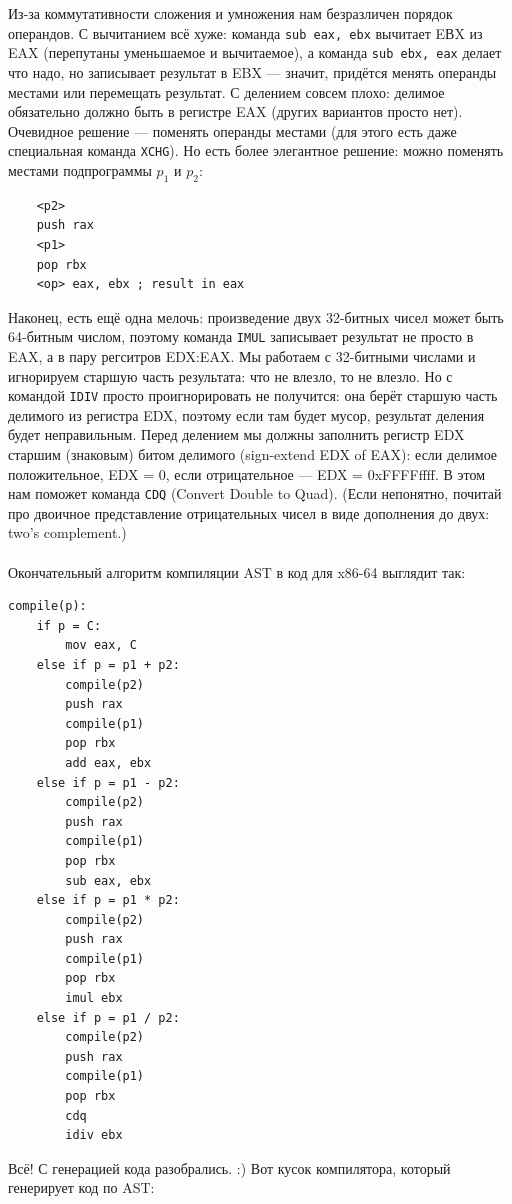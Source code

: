 \documentclass[11pt]{book}
\begin{document}
Из-за коммутативности сложения и умножения нам безразличен порядок операндов.
С вычитанием всё хуже: команда \texttt{sub eax, ebx} вычитает EВX из EAX (перепутаны уменьшаемое и вычитаемое),
а команда \texttt{sub ebx, eax} делает что надо, но записывает результат в EBX ---
значит, придётся менять операнды местами или перемещать результат.
С делением совсем плохо: делимое обязательно должно быть в регистре EAX (других вариантов просто нет).
Очевидное решение --- поменять операнды местами (для этого есть даже специальная команда \texttt{XCHG}).
Но есть более элегантное решение: можно поменять местами подпрограммы $p_1$ и $p_2$:
\begin{verbatim}
    <p2>
    push rax
    <p1>
    pop rbx
    <op> eax, ebx ; result in eax
\end{verbatim}
Наконец, есть ещё одна мелочь:
произведение двух 32-битных чисел может быть 64-битным числом, поэтому команда \texttt{IMUL}
записывает результат не просто в EAX, а в пару регситров EDX:EAX.
Мы работаем с 32-битными числами и игнорируем старшую часть результата: что не влезло, то не влезло.
Но с командой \texttt{IDIV} просто проигнорировать не получится: она берёт старшую часть делимого из регистра EDX,
поэтому если там будет мусор, результат деления будет неправильным.
Перед делением мы должны заполнить регистр EDX старшим (знаковым) битом делимого (sign-extend EDX of EAX): если делимое положительное, EDX = 0,
если отрицательное --- EDX = 0xFFFFffff.
В этом нам поможет команда \texttt{CDQ} (Convert Double to Quad).
(Если непонятно, почитай про двоичное представление отрицательных чисел в виде дополнения до двух: two's complement.)
\\ \\
Окончательный алгоритм компиляции AST в код для x86-64 выглядит так:
\begin{verbatim}
compile(p):
    if p = C:
        mov eax, C
    else if p = p1 + p2:
        compile(p2)
        push rax
        compile(p1)
        pop rbx
        add eax, ebx
    else if p = p1 - p2:
        compile(p2)
        push rax
        compile(p1)
        pop rbx
        sub eax, ebx
    else if p = p1 * p2:
        compile(p2)
        push rax
        compile(p1)
        pop rbx
        imul ebx
    else if p = p1 / p2:
        compile(p2)
        push rax
        compile(p1)
        pop rbx
        cdq
        idiv ebx
\end{verbatim}
Всё!
С генерацией кода разобрались. :)
Вот кусок компилятора, который генерирует код по AST:

\end{document}
